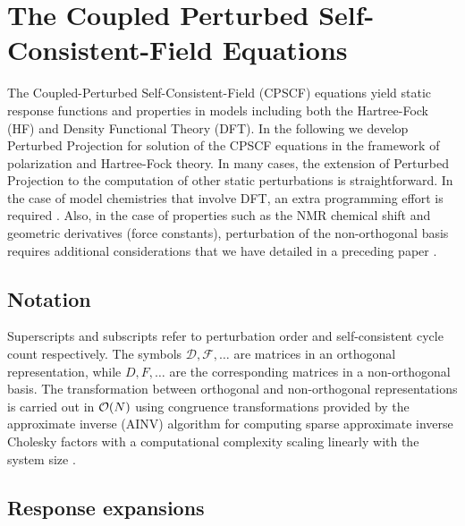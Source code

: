 \documentclass[prl,aps,preprint,showpacs,superbib]{revtex4}
\begin{document}
\section{The Coupled Perturbed Self-Consistent-Field Equations}

The Coupled-Perturbed Self-Consistent-Field (CPSCF) equations yield
static response functions and properties in models including both the 
Hartree-Fock (HF) and Density Functional Theory (DFT).  In the following
we develop Perturbed Projection for solution of the CPSCF equations in the framework of polarization and 
Hartree-Fock theory.  In many cases, the extension of Perturbed Projection to
the computation of other static perturbations is straightforward.  In
the case of model chemistries that involve DFT, an extra programming effort is required \cite{Lee_1994,PSalek02}.
Also, in the case of properties such as the NMR chemical shift and geometric derivatives 
(force constants), perturbation of the non-orthogonal basis requires additional 
considerations that we have detailed in a preceding paper \cite{ANiklasson05a}.

\subsection{Notation}

Superscripts and subscripts refer to perturbation order and 
self-consistent cycle count respectively. The symbols $\mathcal{D},\mathcal{F},\dots$
are matrices in an orthogonal representation, while
$D,F,\dots$ are the corresponding matrices in a non-orthogonal basis.
The transformation between orthogonal and non-orthogonal 
representations is carried out in ${\cal O}(N)$ using
congruence transformations \cite{JWilkinson65,GStewart73} provided 
by the approximate inverse (AINV) algorithm for computing  sparse 
approximate inverse Cholesky factors with a computational complexity
scaling linearly with the system size \cite{MBenzi95,MBenzi96,MBenzi01}.

\subsection{Response expansions}
\end{document}
